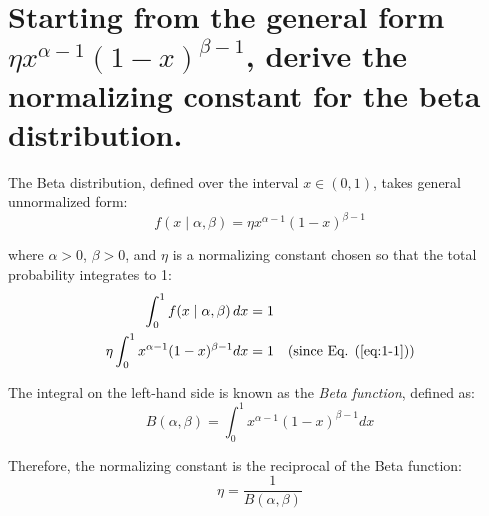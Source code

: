 
\section{Starting from the general form $\eta x^{\alpha - 1}(1 - x)^{\beta - 1}$, derive the normalizing constant for the beta distribution.}

The Beta distribution, defined over the interval $x \in (0, 1)$, takes general unnormalized form:
\begin{equation} \label{eq:1-1}
f(x \mid \alpha, \beta) = \eta x^{\alpha - 1}(1 - x)^{\beta - 1}
\end{equation}

where $\alpha > 0$, $\beta > 0$, and $\eta$ is a normalizing constant chosen so that the total probability integrates to 1:
\begin{align}
\int_0^1 f(x \mid \alpha, \beta)\, dx &= 1 \\
\eta \int_0^1 x^{\alpha - 1}(1 - x)^{\beta - 1} dx &= 1 \quad \text{(since Eq. (\ref{eq:1-1}))}
\end{align}

The integral on the left-hand side is known as the \emph{Beta function}, defined as:
\begin{equation}
B(\alpha, \beta) = \int_0^1 x^{\alpha - 1}(1 - x)^{\beta - 1} dx
\end{equation}

Therefore, the normalizing constant is the reciprocal of the Beta function:
\begin{equation} \label{eq:1-5}
\eta = \frac{1}{B(\alpha, \beta)}
\end{equation}


